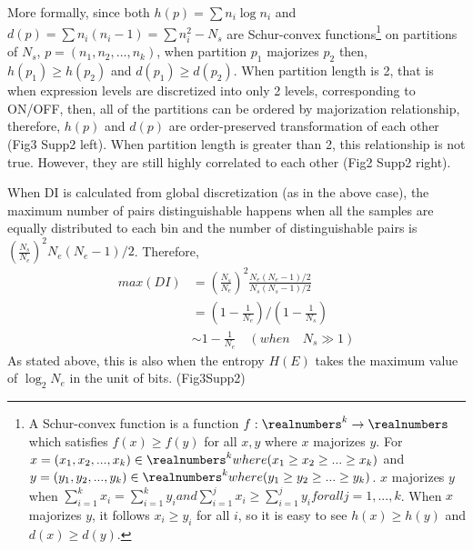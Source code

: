 More formally, since both $h(p) = \sum{n_i\log n_i}$ and $d(p) = \sum n_i(n_i-1) = \sum n_i^2 - N_s$ are Schur-convex functions\footnote{A Schur-convex function is a function $f:\realnumbers^k \rightarrow \realnumbers$ which satisfies $f(x) \geq f(y)$ for all $x,y$ where $x$ majorizes $y$. For $x=(x_1,x_2,...,x_k) \in \realnumbers^k where (x_1 \geq x_2 \geq ... \geq x_k) $ and $y=(y_1,y_2,...,y_k) \in \realnumbers^k where (y_1 \geq y_2 \geq ... \geq y_k)$. $x$ majorizes $y$ when $\sum_{i=1}^{k} x_i = \sum_{i=1}^{k} y_i and \sum_{i=1}^{j} x_i \geq \sum_{i=1}^{j} y_i for all j=1,...,k$. When $x$ majorizes $y$, it follows $x_i \geq y_i$ for all $i$, so it is easy to see $h(x) \geq h(y)$ and $d(x) \geq d(y)$.} on partitions of $N_s$,  $p=(n_1,n_2,...,n_k)$, when partition $p_1$ majorizes $p_2$ then, $h(p_1)\geq h(p_2)$ and $d(p_1)\geq d(p_2)$. When partition length is 2, that is when expression levels are discretized into only 2 levels, corresponding to ON/OFF, then, all of the partitions can be ordered by majorization relationship, therefore, $h(p)$ and $d(p)$ are order-preserved transformation of each other (Fig3 Supp2 left). When partition length is greater than 2, this relationship is not true. However, they are still highly correlated to each other (Fig2 Supp2 right). 

When DI is calculated from global discretization (as in the above case), the maximum number of pairs distinguishable happens when all the samples are equally distributed to each bin and the number of distinguishable pairs is $\left( \frac{N_s}{N_e}\right)^2N_e(N_e-1)/2$. Therefore,
\begin{align}
max(DI) &= \left( \frac{N_s}{N_e}\right)^2 \frac{N_e(N_e-1)/2}{N_s(N_s-1)/2}\\
		&= \left( 1 - \frac{1}{N_e} \right) / \left( 1 - \frac{1}{N_s} \right) \\
        &\sim 1 - \frac{1}{N_e} \quad(when\quad N_s \gg 1)
\end{align}
As stated above, this is also when the entropy $H(E)$ takes the maximum value of $\log_{2} N_e$ in the unit of bits. (Fig3Supp2)
